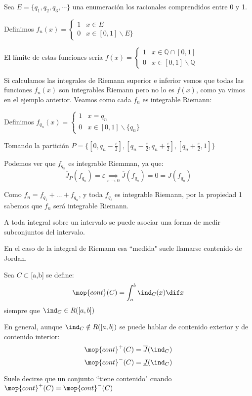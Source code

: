 \documentclass{apuntes}
\begin{document}
\begin{example} $ $

Sea $E = \lbrace q_1, q_2, q_3, \cdots \rbrace$ una enumeración los racionales comprendidos entre 0 y 1.

Definimos $f_n(x)=
\begin{cases}
   1 &  x \in E \\
   0       &  x \in [0,1] \backslash E \rbrace
\end{cases}$

El límite de estas funciones sería $f(x)=
\begin{cases}
   1 &  x \in \mathbb{Q} \cap [0,1] \\
   0       &  x \in [0,1] \backslash \mathbb{Q}
\end{cases}$

Si calculamos las integrales de Riemann superior e inferior vemos que todas las funciones $f_n(x)$ son integrables Riemann pero no lo es $f(x)$, como ya vimos en el ejemplo anterior.
 Veamos como cada $f_n$ es integrable Riemann:


Definimos $f_{q_n}(x) =
\begin{cases}
	1 & x = q_n\\
	0 & x \in [0,1] \backslash \{q_n\}
\end{cases}$

Tomando la partición
$P = \{ [0, q_n - \frac{\varepsilon}{2}], [q_n - \frac{\varepsilon}{2}, q_n + \frac{\varepsilon}{2}], [q_n + \frac{\varepsilon}{2}, 1] \}$


Podemos ver que $f_{q_n}$ es integrable Riemman, ya que:
\[ \overline{J}_P (f_{q_n}) =
\varepsilon \underset{\varepsilon \rightarrow 0}{\implies} \overline{J} (f_{q_n}) = 0 = \underline{J} (f_{q_n}) \]

Como $f_n = f_{q_1} + \ldots + f_{q_n}$, y toda $ f_{q_i}$ es integrable Riemann, por la propiedad 1 sabemos que $f_n$ será integrable Riemann.
\end{example}

\begin{defn}[Contenido]
A toda integral sobre un intervalo se puede asociar una forma de medir subconjuntos del intervalo.

En el caso de la integral de Riemann esa ``medida" suele llamarse contenido de Jordan.

Sea $C\subset$[a,b] se define:
\[\mop{cont}(C) = \int_a^b \ind_{C}(x) \dif x\]
siempre que $\ind_C \in R([a,b])$

En general, aunque $\ind_C \notin R([a,b])$ se puede hablar de contenido exterior y de contenido interior:
\[\mop{cont}^+(C)=\overline{J}(\ind_C)\]
\[\mop{cont}^-(C)=\underline{J}(\ind_C)\]

Suele decirse que un conjunto ``tiene contenido" cuando $\mop{cont}^+(C)=\mop{cont}^-(C)$
\end{defn}
\end{document}
